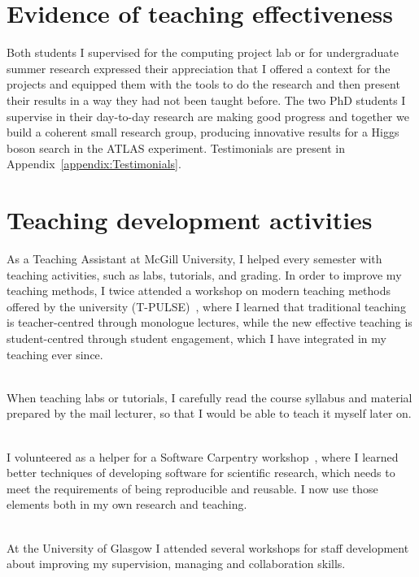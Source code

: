 \documentclass[12pt]{article} %
\begin{document}
\section{Evidence of teaching effectiveness} %
Both students I supervised for the computing project lab or for undergraduate summer research expressed their appreciation that I offered a context for the projects and equipped them with the tools to do the research and then present their results in a way they had not been taught before. The two PhD students I supervise in their day-to-day research are making good progress and together we build a coherent small research group, producing innovative results for a Higgs boson search in the ATLAS experiment. Testimonials are present in Appendix~\ref{appendix:Testimonials}.

\section{Teaching development activities} %
As a Teaching Assistant at McGill University, I helped every semester with teaching activities, such as labs, tutorials, and grading. In order to improve my teaching methods, I twice attended a workshop on modern teaching methods offered by the university (T-PULSE)~\cite{T-PULSE}, where I learned that traditional teaching is teacher-centred through monologue lectures, while the new effective teaching is student-centred through student engagement, which I have integrated in my teaching ever since.

\ \\When teaching labs or tutorials, I carefully read the course syllabus and material prepared by the mail lecturer, so that I would be able to teach it myself later on. 

\ \\I volunteered as a helper for a Software Carpentry workshop~\cite{SoftwareCarpentry}, where I learned better techniques of developing software for scientific research, which needs to meet the requirements of being reproducible and reusable. I now use those elements both in my own research and teaching.  

\ \\At the University of Glasgow I attended several workshops for staff development about improving my supervision, managing and collaboration skills. 
\end{document}
